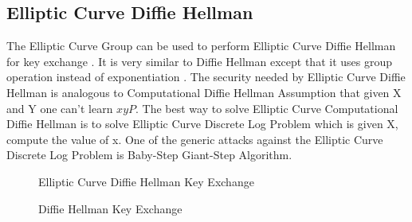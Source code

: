 \subsection{Elliptic Curve Diffie Hellman}

The Elliptic Curve Group can be used to perform Elliptic Curve Diffie Hellman for key exchange . It is very similar to Diffie Hellman except that it uses group operation instead of exponentiation . The security needed by Elliptic Curve Diffie Hellman is analogous to Computational Diffie Hellman Assumption that given X and Y one can't learn $xyP$. The best way to solve Elliptic Curve Computational Diffie Hellman is to solve Elliptic Curve Discrete Log Problem which is given X, compute the value of x. One of the generic attacks against the Elliptic Curve Discrete Log Problem is Baby-Step Giant-Step Algorithm.

\begin{figure}[t]
  \centering
  \caption{Elliptic Curve Diffie Hellman Key Exchange}
  \label{fig:ecdh}
\end{figure}

\begin{figure}[t]
  \centering
  \caption{Diffie Hellman Key Exchange }
  \label{fig:dh}
\end{figure}


